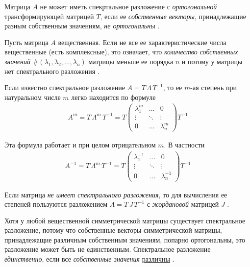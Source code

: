 \documentclass[%
	11pt,
	a4paper,
	utf8,
		]{article}
\begin{document}
Матрица $ A $ не может иметь спекртальное разложение с \emph{ортогональной} трансформирующей матрицей $ T $, если ее \emph{собственные векторы}, принадлежащие разным собственным значениям, \emph{не ортогональны} \cite[]{shevtsov:linal-2012}.

Пусть матрица $ A $ вещественная. Если не все ее характеристические числа вещественные (есть комплексные), это означает, что \emph{количество собственных значений} $ \#(\lambda_1, \lambda_2, \ldots, \lambda_n) $ матрицы меньше ее порядка $ n $ и потому у матрицы нет спектрального разложения \cite[]{shevtsov:linal-2012}.

Если известно спектральное разложение $ A = T \, \Lambda \, T^{-1} $, то ее $ m $-ая степень при натуральном числе $ m $ легко находится по формуле \cite[]{shevtsov:linal-2012}
\begin{align*}
	A^m = T \, \Lambda^m \, T^{-1} = T \begin{pmatrix}
		\lambda_1^m & \ldots & 0 \\
		\vdots & \ddots & \vdots \\
		0 & \ldots & \lambda_n^m
	\end{pmatrix} T^{-1}
\end{align*}

Эта формула работает и при целом отрицательном $ m $. В частности \cite[]{shevtsov:linal-2012}
\begin{align*}
	A^{-1} = T \, \Lambda^m \, T^{-1} = T \begin{pmatrix}
		\lambda_1^{-1} & \ldots & 0 \\
		\vdots & \ddots & \vdots \\
		0 & \ldots & \lambda_n^{-1}
	\end{pmatrix} T^{-1}
\end{align*}

Если матрица \emph{не имеет спектрального разложения}, то для вычисления ее степеней пользуются разложением $ A = T \, J \, T^{-1} $ с \emph{жордановой} матрицей $ J $ \cite[]{shevtsov:linal-2012}.

Хотя у любой вещественной симметрической матрицы существует спектральное разложение, потому что собственные векторы симметрической матрицы, принадлежащие различным собственным значениям, попарно ортогональны, это разложение может быть не единственным. Спектральное разложение \emph{единственно}, если все \emph{собственные значения} \underline{различны} \cite[]{goodfellow:ml-2018}.
\end{document}
